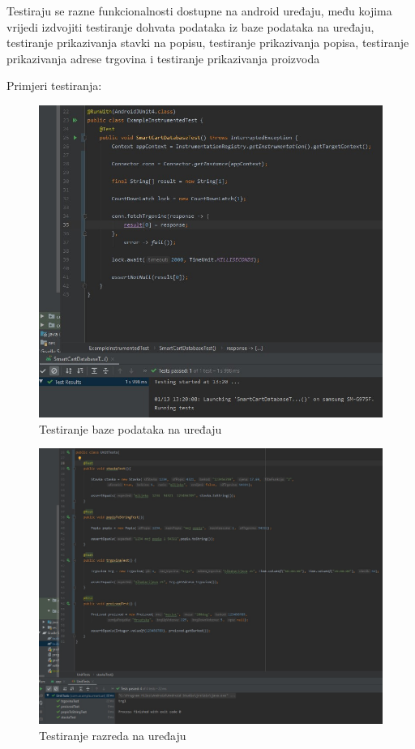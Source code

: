 			Testiraju se razne funkcionalnosti dostupne na android uređaju, među kojima
			vrijedi izdvojiti testiranje dohvata podataka iz baze podataka na uređaju, testiranje prikazivanja
			stavki na popisu, testiranje prikazivanja popisa, testiranje prikazivanja adrese trgovina i testiranje
			prikazivanja proizvoda
			
			Primjeri testiranja:
			
			\begin{figure}[H]
				\centering
				\includegraphics[scale=0.7]{slike/androidTest1.jpg}
				\caption{Testiranje baze podataka na uređaju}
				\label{fig:test_uredaj_db}
			\end{figure}
		
			\begin{figure}[H]
				\centering
				\includegraphics[scale=0.5]{slike/androidTest2.jpg}
				\caption{Testiranje razreda na uređaju}
				\label{fig:test_uredaj_class}
			\end{figure}
		
